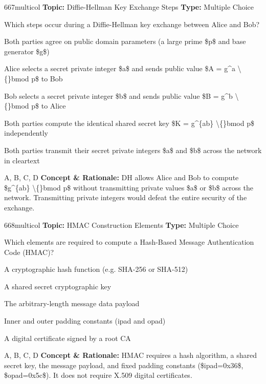 \begin{qcard}{667}{multicol}
\textcolor{darkslate!75}{\small\textbf{Topic:} Diffie-Hellman Key Exchange Steps \hfill \textbf{Type:} Multiple Choice}\vspace{0.4em}\par
Which steps occur during a Diffie-Hellman key exchange between Alice and Bob?
\begin{qoptions}
\item Both parties agree on public domain parameters (a large prime \$p\$ and base generator \$g\$)
\item Alice selects a secret private integer \$a\$ and sends public value \$A = g\textasciicircum{}a \textbackslash\{\}bmod p\$ to Bob
\item Bob selects a secret private integer \$b\$ and sends public value \$B = g\textasciicircum{}b \textbackslash\{\}bmod p\$ to Alice
\item Both parties compute the identical shared secret key \$K = g\textasciicircum{}\{ab\} \textbackslash\{\}bmod p\$ independently
\item Both parties transmit their secret private integers \$a\$ and \$b\$ across the network in cleartext
\end{qoptions}
\end{qcard}
\nopagebreak
\begin{explainbox}{A, B, C, D}
\textbf{Concept \& Rationale:} DH allows Alice and Bob to compute \$g\textasciicircum{}\{ab\} \textbackslash\{\}bmod p\$ without transmitting private values \$a\$ or \$b\$ across the network. Transmitting private integers would defeat the entire security of the exchange.
\end{explainbox}

\begin{qcard}{668}{multicol}
\textcolor{darkslate!75}{\small\textbf{Topic:} HMAC Construction Elements \hfill \textbf{Type:} Multiple Choice}\vspace{0.4em}\par
Which elements are required to compute a Hash-Based Message Authentication Code (HMAC)?
\begin{qoptions}
\item A cryptographic hash function (e.g. SHA-256 or SHA-512)
\item A shared secret cryptographic key
\item The arbitrary-length message data payload
\item Inner and outer padding constants (ipad and opad)
\item A digital certificate signed by a root CA
\end{qoptions}
\end{qcard}
\nopagebreak
\begin{explainbox}{A, B, C, D}
\textbf{Concept \& Rationale:} HMAC requires a hash algorithm, a shared secret key, the message payload, and fixed padding constants (\$ipad=0x36\$, \$opad=0x5c\$). It does not require X.509 digital certificates.
\end{explainbox}

